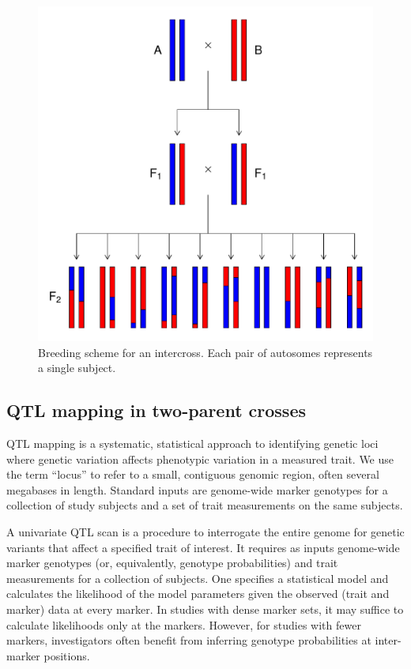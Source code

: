 \documentclass[]{article}\usepackage[]{graphicx}\usepackage[]{color}
\makeatletter
\def\maxwidth{ %
  \ifdim\Gin@nat@width>\linewidth
    \linewidth
  \else
    \Gin@nat@width
  \fi
}
\newenvironment{knitrout}{}{} %
\def\maxwidth{\ifdim\Gin@nat@width>\linewidth\linewidth\else\Gin@nat@width\fi}
\makeatother
\begin{document}
\begin{knitrout}
\color{fgcolor}\begin{figure}
\includegraphics[width=\maxwidth]{figure/intercross-1} \caption[Breeding scheme for an intercross]{Breeding scheme for an intercross. Each pair of autosomes represents a single subject.}\label{fig:intercross}
\end{figure}


\end{knitrout}


\subsection{QTL mapping in two-parent crosses}

QTL mapping is a systematic, statistical approach to identifying genetic
loci where genetic variation affects phenotypic variation in a measured trait.
We use the term ``locus'' to refer to a small, contiguous genomic region, often
several megabases in length. Standard inputs are genome-wide marker genotypes for a collection of study subjects and a set of trait measurements on the same subjects.

A univariate QTL scan is a procedure to interrogate the entire genome for genetic
variants that affect a specified trait of interest.
It requires as inputs genome-wide marker genotypes (or, equivalently,
genotype probabilities) and trait measurements for a collection of subjects.
One specifies a statistical model and calculates the
likelihood of the model parameters given the observed (trait and marker) data at every marker. In studies with dense marker sets, 
it may suffice to calculate likelihoods only at the markers. However, for
studies with fewer markers, investigators often benefit from inferring 
genotype probabilities at inter-marker positions.
\end{document}
